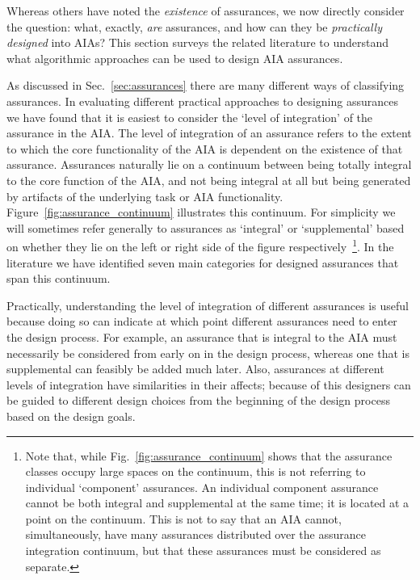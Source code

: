 Whereas others have noted the \textit{existence} of assurances, we now directly consider the question: what, exactly, \textit{are} assurances, and how can they be \textit{practically designed} into AIAs? 
This section surveys the related literature to understand what algorithmic approaches can be used to design AIA assurances. %

As discussed in Sec.~\ref{sec:assurances} there are many different ways of classifying assurances. In evaluating different practical approaches to designing assurances we have found that it is easiest to consider the `level of integration' of the assurance in the AIA. The level of integration of an assurance refers to the extent to which the core functionality of the AIA is dependent on the existence of that assurance. Assurances naturally lie on a continuum between being totally integral to the core function of the AIA, and not being integral at all but being generated by artifacts of the underlying task or AIA functionality.  Figure~\ref{fig:assurance_continuum} illustrates this continuum. For simplicity we will sometimes refer generally to assurances as `integral' or `supplemental' based on whether they lie on the left or right side of the figure respectively~\footnote{Note that, while Fig.~\ref{fig:assurance_continuum} shows that the assurance classes occupy large spaces on the continuum, this is not referring to individual `component' assurances. An individual component assurance cannot be both integral and supplemental at the same time; it is located at a point on the continuum. This is not to say that an AIA cannot, simultaneously, have many assurances distributed over the assurance integration continuum, but that these assurances must be considered as separate.}. In the literature we have identified seven main categories for designed assurances that span this continuum.

Practically, understanding the level of integration of different assurances is useful because doing so can indicate at which point different assurances need to enter the design process. For example, an assurance that is integral to the AIA must necessarily be considered from early on in the design process, whereas one that is supplemental can feasibly be added much later. Also, assurances at different levels of integration have similarities in their affects; because of this designers can be guided to different design choices from the beginning of the design process based on the design goals.

